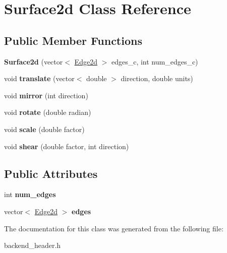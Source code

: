 \hypertarget{classSurface2d}{}\section{Surface2d Class Reference}
\label{classSurface2d}
\subsection*{Public Member Functions}
\begin{DoxyCompactItemize}
\item 
{\bfseries Surface2d} (vector$<$ \hyperlink{classEdge2d}{Edge2d} $>$ edges\+\_\+c, int num\+\_\+edges\+\_\+c)\hypertarget{classSurface2d_ac22d9270baf7e6c489e9c49b7e4fba18}{}\label{classSurface2d_ac22d9270baf7e6c489e9c49b7e4fba18}

\item 
void {\bfseries translate} (vector$<$ double $>$ direction, double units)\hypertarget{classSurface2d_ae01681fb2a990db79d8ee715886c9742}{}\label{classSurface2d_ae01681fb2a990db79d8ee715886c9742}

\item 
void {\bfseries mirror} (int direction)\hypertarget{classSurface2d_ae827b73d9fb0a4d8085fd922cfd4cdc8}{}\label{classSurface2d_ae827b73d9fb0a4d8085fd922cfd4cdc8}

\item 
void {\bfseries rotate} (double radian)\hypertarget{classSurface2d_a1749d13ad536db0ebce644f4825585cf}{}\label{classSurface2d_a1749d13ad536db0ebce644f4825585cf}

\item 
void {\bfseries scale} (double factor)\hypertarget{classSurface2d_a18e70bf087f1676ddee54d38e0a142e2}{}\label{classSurface2d_a18e70bf087f1676ddee54d38e0a142e2}

\item 
void {\bfseries shear} (double factor, int direction)\hypertarget{classSurface2d_ac3727d4fbe2ab84a6d6332ac31514a18}{}\label{classSurface2d_ac3727d4fbe2ab84a6d6332ac31514a18}

\end{DoxyCompactItemize}
\subsection*{Public Attributes}
\begin{DoxyCompactItemize}
\item 
int {\bfseries num\+\_\+edges}\hypertarget{classSurface2d_abfd3a79363f04c26694262e17aa600e7}{}\label{classSurface2d_abfd3a79363f04c26694262e17aa600e7}

\item 
vector$<$ \hyperlink{classEdge2d}{Edge2d} $>$ {\bfseries edges}\hypertarget{classSurface2d_a05deea155e1b9b64fc02b922df17751c}{}\label{classSurface2d_a05deea155e1b9b64fc02b922df17751c}

\end{DoxyCompactItemize}


The documentation for this class was generated from the following file\+:\begin{DoxyCompactItemize}
\item 
backend\+\_\+header.\+h\end{DoxyCompactItemize}
